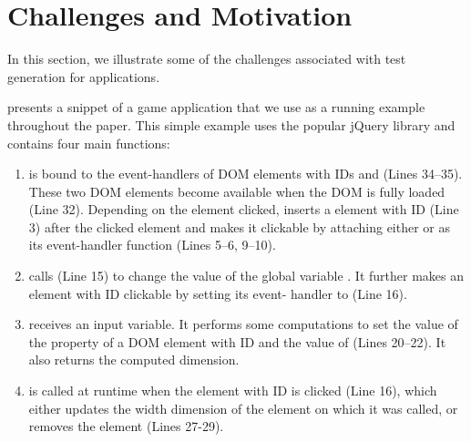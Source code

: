 \section{Challenges and Motivation} \label{Sec:motivation}

 

In this section, we illustrate some of the challenges associated with test generation for \javascript applications. 
%

 presents a snippet of a \javascript game application that we use as a running example throughout the paper. This simple example uses the popular jQuery library \cite{jquery-api} and contains four main \javascript functions: 

\begin{enumerate} %

\item {} is bound to the event-handlers of DOM elements with IDs  and   (Lines 34--35). These two DOM elements become available when the DOM is fully loaded (Line 32). Depending on the element clicked,  inserts a  element with ID  (Line 3) after the clicked element and makes it clickable by attaching either  or  as its event-handler function (Lines 5--6, 9--10).    

\item {} calls  (Line 15) to change the value of the global variable . It further makes an element with ID  clickable by setting its event- handler to  (Line 16).

\item {} receives an input variable. It performs some computations to set the  value of the  property of a DOM element with ID   and the value of  (Lines 20--22). It also returns the computed dimension.

\item {} is called at runtime when the element with ID  is clicked (Line 16), which either updates the width dimension of the element on which it was called, or removes the element (Lines 27-29).
\end{enumerate}

